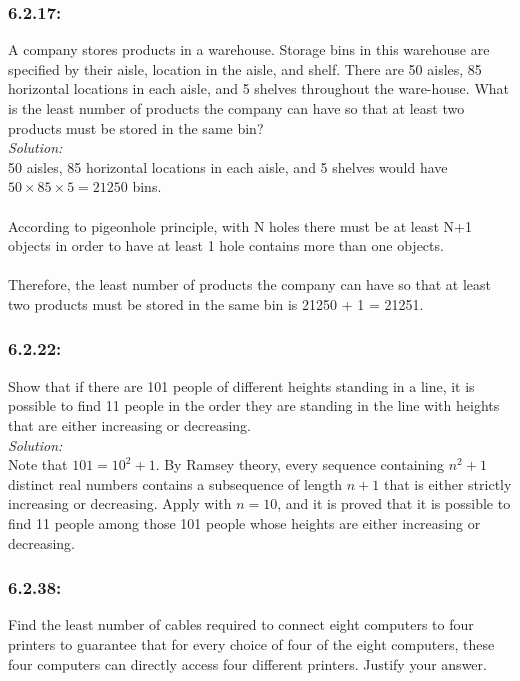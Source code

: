 \documentclass[a4paper]{article}
\begin{document}
	\subsubsection*{6.2.17:}
	A company stores products in a warehouse. Storage bins in this warehouse are specified by their aisle, location in the aisle, and shelf. There are 50 aisles, 85 horizontal locations in each aisle, and 5 shelves throughout the ware-house. What is the least number of products the company can have so that at least two products must be stored in the same bin?\\
	\textit{Solution:}\\
	50 aisles, 85 horizontal locations in each aisle, and 5 shelves would have $50\times85\times5 = 21250$ bins.\\\\
	According to pigeonhole principle, with N holes there must be at least N+1 objects in order to have at least 1 hole contains more than one objects.\\\\
	Therefore, the least number of products the company can have so that at least two products must be stored in the same bin is 21250 + 1 = 21251.
	\subsubsection*{6.2.22:}
	Show that if there are 101 people of different heights standing in a line, it is possible to find 11 people in the order they are standing in the line with heights that are either increasing or decreasing.\\
	
	\textit{Solution: }\\ 
	Note that $101 = 10^2 + 1$. By Ramsey theory, every sequence containing $n^2 + 1$ distinct real numbers contains a subsequence of length $n+1$ that is either strictly increasing or decreasing. Apply with $n=10$, and it is proved that it is possible to find 11 people among those 101 people whose heights are either increasing or decreasing.
	
	\subsubsection*{6.2.38:}
	Find the least number of cables required to connect eight computers to four printers to guarantee that for every choice of four of the eight computers, these four computers can directly access four different printers. Justify your answer.\\
	
\end{document}
